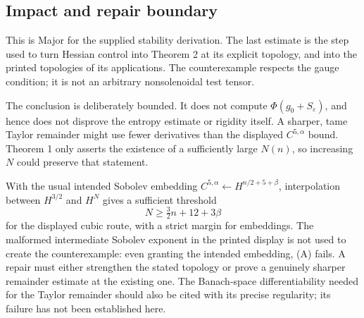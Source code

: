 \documentclass[10pt]{article}
\begin{document}
\subsection*{Impact and repair boundary}
This is Major for the supplied stability derivation. The last estimate is the step used to turn Hessian control into Theorem 2 at its explicit topology, and into the printed topologies of its applications. The counterexample respects the gauge condition; it is not an arbitrary nonsolenoidal test tensor.\par
The conclusion is deliberately bounded. It does not compute \(\Phi(g_0+S_\varepsilon)\), and hence does not disprove the entropy estimate or rigidity itself. A sharper, tame Taylor remainder might use fewer derivatives than the displayed \(C^{5,\alpha}\) bound. Theorem 1 only asserts the existence of a sufficiently large \(N(n)\), so increasing \(N\) could preserve that statement.\par
With the usual intended Sobolev embedding \(C^{5,\alpha}\leftarrow H^{n/2+5+\beta}\), interpolation between \(H^{3/2}\) and \(H^N\) gives a sufficient threshold \[N\ge\tfrac32 n+12+3\beta\] for the displayed cubic route, with a strict margin for embeddings. The malformed intermediate Sobolev exponent in the printed display is not used to create the counterexample: even granting the intended embedding, (A) fails. A repair must either strengthen the stated topology or prove a genuinely sharper remainder estimate at the existing one. The Banach-space differentiability needed for the Taylor remainder should also be cited with its precise regularity; its failure has not been established here.\par
\end{document}
